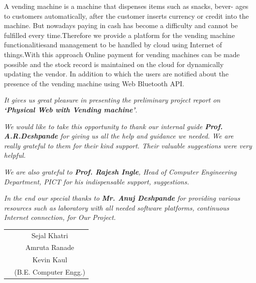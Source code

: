 \documentclass[oneside,a4paper,12pt]{report}
\begin{document}
\newpage

\setcounter{page}{0}
\frontmatter
{}
\rfoot{\thepage}

		
{   \setlength{\parindent}{11mm} }
{ \setlength{\parindent}{0mm} }
 A vending machine is a machine that dispenses items such as snacks, bever-
ages to customers automatically, after the customer inserts currency or credit
into the machine. But nowadays paying in cash has become a difficulty and cannot be fulfilled every time.Therefore we provide a platform for the vending machine functionalitiesand management to be handled by cloud using Internet of things.With this approach Online payment for vending machines can be made possible and the
stock record is maintained on the cloud for dynamically updating the vendor.
In addition to which the users are notified about the presence of the vending
machine using Web Bluetooth API.


{   \setlength{\parindent}{11mm} }
{ \setlength{\parindent}{0mm} }

\textit{It gives us great pleasure in presenting the preliminary project report 
on {\bfseries \fontsize{12}{12} \selectfont `Physical Web with Vending machine'}.}
\vspace*{1.5\baselineskip}

 \textit{We would like to take this opportunity to thank our internal guide
 \textbf{Prof. A.R.Deshpande} for giving us all the help and guidance we needed. We are really grateful to them for their kind support. Their valuable suggestions were very helpful.} \vspace*{1.5\baselineskip}

 \textit{We are also grateful to \textbf{Prof. Rajesh Ingle}, Head of Computer
 Engineering Department, PICT for his indispensable
 support, suggestions.}
\vspace*{1.5\baselineskip}

\textit{In the end our special thanks to \textbf{Mr. Anuj Deshpande} for
providing various resources such as  laboratory with all needed software platforms,
continuous Internet connection, for Our Project.}
\vspace*{3\baselineskip} \\
\begin{tabular}{p{8.2cm}c}
&Sejal Khatri\\
&Amruta Ranade\\
&Kevin Kaul\\
&(B.E. Computer Engg.)
\end{tabular}
\end{document}
